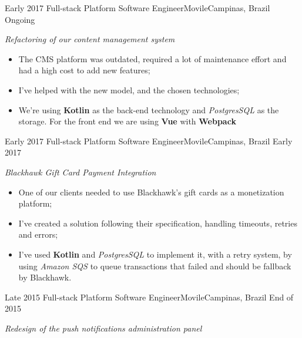 %
%
%


\begin{experiences}
  \experience
  {Early 2017} {Full-stack Platform Software Engineer}{Movile}{Campinas, Brazil}
  {Ongoing}
        {
        \emph{Refactoring of our content management system}\\
          \begin{itemize}
            \item The CMS platform was outdated, required a lot of maintenance effort and had a high cost to add new features;
            \item I've helped with the new model, and the chosen technologies;
            \item We're using \textbf{Kotlin} as the back-end technology and \emph{PostgresSQL} as the storage. For the front end we are using \textbf{Vue} with \textbf{Webpack} \\
          \end{itemize}
        }{}
  \experience
  {Early 2017} {Full-stack Platform Software Engineer}{Movile}{Campinas, Brazil}
  {Early 2017}
        {
        \emph{Blackhawk Gift Card Payment Integration}\\
          \begin{itemize}
            \item One of our clients needed to use Blackhawk's gift cards as a monetization platform;
            \item I've created a solution following their specification, handling timeouts, retries and errors;
            \item I've used \textbf{Kotlin} and \emph{PostgresSQL} to implement it, with a retry system, by using \emph{Amazon SQS} to queue
            transactions that failed and should be fallback by Blackhawk.\\
          \end{itemize}
        }{}
  \experience
  {Late 2015} {Full-stack Platform Software Engineer}{Movile}{Campinas, Brazil}
  {End of 2015}
        {
        \emph{Redesign of the push notifications administration panel}\\
          \begin{itemize}

\end{itemize}}
\end{experiences}
